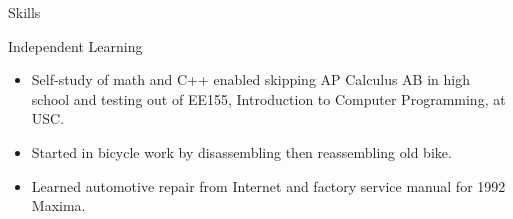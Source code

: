 \documentclass[11pt, letterpaper]{article}
\begin{document}
\begin{cv}{\color{blue}{Eric A. Cioffi}}
\begin{cvlist}{Skills}
    \setlength{\itemsep}{-0.25em} %
    \item[Independent Learning]
    \begin{itemize}[topsep=-0.5em, itemindent=0em, labelsep=0.5em, leftmargin=1em, itemsep=0em]
        \small
        \item Self-study of math and C++ enabled skipping AP Calculus AB in high school and testing out of EE155, Introduction to Computer Programming, at USC.
        \item Started in bicycle work by disassembling then reassembling old bike.
        \item Learned automotive repair from Internet and factory service manual for 1992 Maxima.
    \end{itemize}
    
\end{cvlist}

\end{cv}
\end{document}
